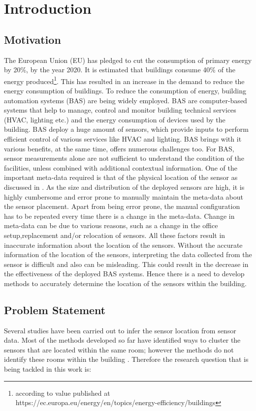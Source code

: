 \chapter{Introduction}
\label{chp:introduction}
\section{Motivation}
The European Union (EU) has pledged to cut the consumption of primary energy by 20\%, by the year 2020.  It is estimated that buildings consume 40\% of the energy produced\footnote{according to value published at https://ec.europa.eu/energy/en/topics/energy-efficiency/buildings }.  This has resulted in an increase in the demand to reduce the energy consumption of buildings. To reduce the consumption of energy, building automation systems (BAS) are being widely employed. BAS are computer-based systems that help to manage, control and monitor building technical services (HVAC, lighting etc.) and the energy consumption of devices used by the building.  BAS deploy a huge amount of sensors, which provide inputs to perform efficient control of various services like HVAC and lighting. BAS brings with it various benefits, at the same time, offers numerous challenges too. For BAS, sensor measurements alone are not sufficient to understand the condition of the facilities, unless combined with additional contextual information. One of the important meta-data required is that of the physical location of the sensor as discussed in  \cite{liu2009requirements}.
As the size and distribution of the deployed sensors are high, it is highly cumbersome and error prone to manually maintain the meta-data about the sensor placement. Apart from being error prone, the manual configuration has to be repeated every time there is a change in the meta-data. Change in meta-data can be due to various reasons, such as a change in the office setup,replacement and/or relocation of sensors. All these factors result in inaccurate information about the location of the sensors. Without the accurate information of the location of the sensors, interpreting the data collected from the sensor is difficult and also can be misleading. This could result in the decrease in the effectiveness of the deployed BAS systems. Hence there is a need to develop methods to accurately determine the location of the sensors within the building.

\section{Problem Statement}
Several studies have been carried out to infer the sensor location from sensor data. Most of the methods developed so far have identified ways to cluster the sensors that are located within the same room; however the methods do not identify these rooms within the building \cite{doi:10.1061/9780784413616.226}.  Therefore the research question that is being tackled in this work is:

